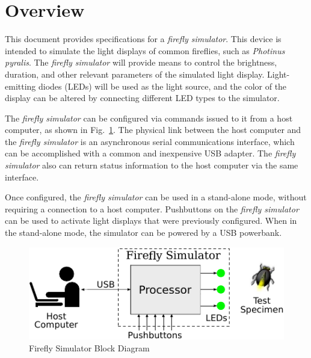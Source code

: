 \documentclass[letterpaper,11pt]{article}
\begin{document}
\section{Overview}

This document provides specifications for a \textit{firefly simulator}. This
device is intended to simulate the light displays of common fireflies, such
as \textit{Photinus pyralis}. The \textit{firefly simulator} will provide means
to control the brightness, duration, and other relevant parameters of the
simulated light display. Light-emitting diodes (LEDs) will be used as the light
source, and the color of the display can be altered by connecting different
LED types to the simulator.

The \textit{firefly simulator} can be configured via commands issued to it
from a host computer, as shown in Fig.\ \ref{fig:BlockDiagram}. The physical
link between the host computer and the \textit{firefly simulator} is an
asynchronous serial communications interface, which can be accomplished with a
common and inexpensive USB adapter. The \textit{firefly simulator} also can
return status information to the host computer via the same interface.

Once configured, the \textit{firefly simulator} can be used in a stand-alone
mode, without requiring a connection to a host computer. Pushbuttons on the
\textit{firefly simulator} can be used to activate light displays that were
previously configured. When in the stand-alone mode, the simulator can be
powered by a USB powerbank.

\begin{figure}[h]
  \begin{center}
    \includegraphics[scale=1.5]{Flashes_BlockDiagram}
  \end{center}
  \vspace{-18pt}
  \caption{Firefly Simulator Block Diagram}
  \label{fig:BlockDiagram}
\end{figure}
\end{document}
